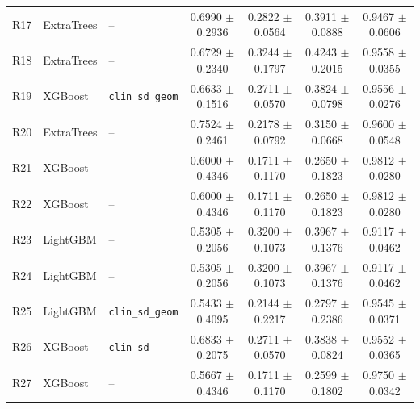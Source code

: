 \begin{landscape}
\begin{longtable}{rllcccc}
R17 & ExtraTrees & -- & 0.6990 $\pm$ 0.2936 & 0.2822 $\pm$ 0.0564 & 0.3911 $\pm$ 0.0888 & 0.9467 $\pm$ 0.0606 \\
R18 & ExtraTrees & -- & 0.6729 $\pm$ 0.2340 & 0.3244 $\pm$ 0.1797 & 0.4243 $\pm$ 0.2015 & 0.9558 $\pm$ 0.0355 \\
R19 & XGBoost & \texttt{clin\_sd\_geom} & 0.6633 $\pm$ 0.1516 & 0.2711 $\pm$ 0.0570 & 0.3824 $\pm$ 0.0798 & 0.9556 $\pm$ 0.0276 \\
R20 & ExtraTrees & -- & 0.7524 $\pm$ 0.2461 & 0.2178 $\pm$ 0.0792 & 0.3150 $\pm$ 0.0668 & 0.9600 $\pm$ 0.0548 \\
R21 & XGBoost & -- & 0.6000 $\pm$ 0.4346 & 0.1711 $\pm$ 0.1170 & 0.2650 $\pm$ 0.1823 & 0.9812 $\pm$ 0.0280 \\
R22 & XGBoost & -- & 0.6000 $\pm$ 0.4346 & 0.1711 $\pm$ 0.1170 & 0.2650 $\pm$ 0.1823 & 0.9812 $\pm$ 0.0280 \\
R23 & LightGBM & -- & 0.5305 $\pm$ 0.2056 & 0.3200 $\pm$ 0.1073 & 0.3967 $\pm$ 0.1376 & 0.9117 $\pm$ 0.0462 \\
R24 & LightGBM & -- & 0.5305 $\pm$ 0.2056 & 0.3200 $\pm$ 0.1073 & 0.3967 $\pm$ 0.1376 & 0.9117 $\pm$ 0.0462 \\
R25 & LightGBM & \texttt{clin\_sd\_geom} & 0.5433 $\pm$ 0.4095 & 0.2144 $\pm$ 0.2217 & 0.2797 $\pm$ 0.2386 & 0.9545 $\pm$ 0.0371 \\
R26 & XGBoost & \texttt{clin\_sd} & 0.6833 $\pm$ 0.2075 & 0.2711 $\pm$ 0.0570 & 0.3838 $\pm$ 0.0824 & 0.9552 $\pm$ 0.0365 \\
R27 & XGBoost & -- & 0.5667 $\pm$ 0.4346 & 0.1711 $\pm$ 0.1170 & 0.2599 $\pm$ 0.1802 & 0.9750 $\pm$ 0.0342 \\
\end{longtable}
\endgroup
\end{landscape}


